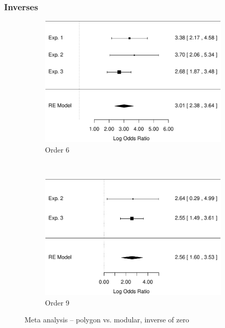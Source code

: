 \documentclass[man,10pt]{apa6}
\begin{document}
\subsubsection{Inverses}
\begin{figure}
\centering
\begin{subfigure}[c]{0.4\textwidth}
\centering
\includegraphics[width=\textwidth]{figures/meta/question_typeinverse_zero_6_conditionpolygon.pdf}
\caption{Order 6}
\end{subfigure}
~
\begin{subfigure}[c]{0.4\textwidth}
\centering
\includegraphics[width=\textwidth]{figures/meta/question_typeinverse_zero_9_conditionpolygon.pdf}
\caption{Order 9}
\end{subfigure}
\caption{Meta analysis -- polygon vs. modular, inverse of zero}
\label{meta_inZ_p}
\end{figure}\noindent 
\end{document}
